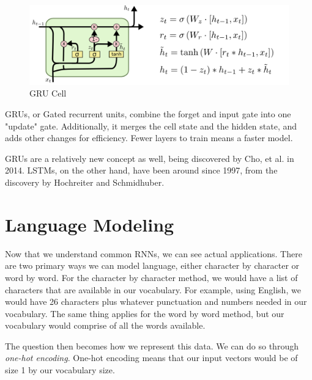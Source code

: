 \documentclass{article}
\begin{document}
\begin{figure}[H]
\centering
\includegraphics[scale=0.5]{GRU.png}
\caption{GRU Cell}
\label{fig:gru}
\end{figure}

GRUs, or Gated recurrent units, combine the forget and input gate into one "update" gate. Additionally, it merges the cell state and the hidden state, and adds other changes for efficiency. Fewer layers to train means a faster model.

GRUs are a relatively new concept as well, being discovered by Cho, et al. in 2014. LSTMs, on the other hand, have been around since 1997, from the discovery by Hochreiter and Schmidhuber.

\section{Language Modeling}

Now that we understand common RNNs, we can see actual applications. There are two primary ways we can model language, either character by character or word by word. For the character by character method, we would have a list of characters that are available in our vocabulary. For example, using English, we would have 26 characters plus whatever punctuation and numbers needed in our vocabulary. The same thing applies for the word by word method, but our vocabulary would comprise of all the words available.

The question then becomes how we represent this data. We can do so through \textit{one-hot encoding}. One-hot encoding means that our input vectors would be of size 1 by our vocabulary size.
\end{document}
